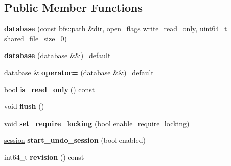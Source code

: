 \subsection*{Public Member Functions}
\begin{DoxyCompactItemize}
\item 
\mbox{\label{classchainbase_1_1database_a885a98ca22fc6bedf7e18e750f024673}} 
{\bfseries database} (const bfs\+::path \&dir, open\+\_\+flags write=read\+\_\+only, uint64\+\_\+t shared\+\_\+file\+\_\+size=0)
\item 
\mbox{\label{classchainbase_1_1database_ac1f047331d68fca270e8323a23e86922}} 
{\bfseries database} (\mbox{\hyperlink{classchainbase_1_1database}{database}} \&\&)=default
\item 
\mbox{\label{classchainbase_1_1database_a4ed9c6960ef68641bdaecd463d357bc7}} 
\mbox{\hyperlink{classchainbase_1_1database}{database}} \& {\bfseries operator=} (\mbox{\hyperlink{classchainbase_1_1database}{database}} \&\&)=default
\item 
\mbox{\label{classchainbase_1_1database_ac34261887e651719813a8cffb4f31d87}} 
bool {\bfseries is\+\_\+read\+\_\+only} () const
\item 
\mbox{\label{classchainbase_1_1database_ad6221b0d1c8a5961f6579af1e3cf2870}} 
void {\bfseries flush} ()
\item 
\mbox{\label{classchainbase_1_1database_ad544b6a999bff16775ebd96dfb6b8e27}} 
void {\bfseries set\+\_\+require\+\_\+locking} (bool enable\+\_\+require\+\_\+locking)
\item 
\mbox{\label{classchainbase_1_1database_abb570c03bda1ee6ae1b428d41481b476}} 
\mbox{\hyperlink{structchainbase_1_1database_1_1session}{session}} {\bfseries start\+\_\+undo\+\_\+session} (bool enabled)
\item 
\mbox{\label{classchainbase_1_1database_a224fc0c346a93fd027bfa2515f54bf98}} 
int64\+\_\+t {\bfseries revision} () const
\item 
\mbox{\label{classchainbase_1_1database_a167bce30384de1f373ebe0c25d4d0de6}} 

\end{DoxyCompactItemize}
